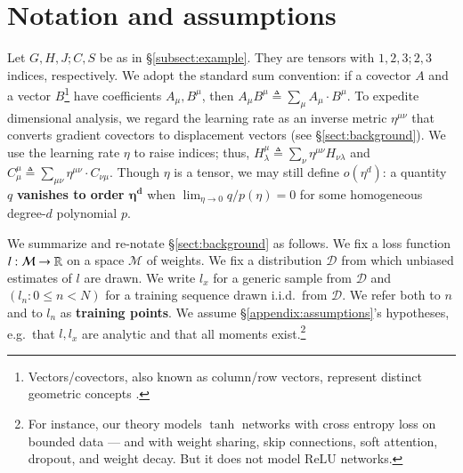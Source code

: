\documentclass[openany, notitlepage, justified]{tufte-book}
\theoremstyle{plain}
\theoremstyle{definition}
\newcommand{\Dd}{\mathcal{D}}
\newcommand{\Mm}{\mathcal{M}}
\begin{document}
\section{Notation and assumptions} \label{sect:notation}
       

        Let $G, H, J; C, S$ be as in \S \ref{subsect:example}.  They are
        tensors with $1, 2, 3; 2, 3$ indices, respectively.
        We adopt the standard sum convention: if a covector $A$ and a vector
        $B$\footnote{
            Vectors/covectors, also known as column/row vectors,
            represent distinct geometric concepts \citep{ko93}. 
        } have coefficients $A_\mu, B^\mu$, then 
        $
            A_\mu B^\mu
            \triangleq
            \sum_\mu A_\mu \cdot B^\mu
        $.
        To expedite dimensional analysis,
        we regard the learning rate as an
        inverse metric $\eta^{\mu\nu}$ that converts gradient covectors to
        displacement vectors (see \S\ref{sect:background}).  We use the
        learning rate $\eta$ to raise indices; thus,
        $
            H^{\mu}_{\lambda}
            \triangleq
            \sum_{\nu} 
            \eta^{\mu\nu} H_{\nu\lambda}
        $ and
        $
            C^{\mu}_{\mu}
            \triangleq
            \sum_{\mu \nu} \eta^{\mu\nu} \cdot C_{\nu\mu}
        $.
        Though $\eta$ is a tensor, we may still define $o(\eta^d)$: a quantity
        $q$ \textbf{vanishes to order $\mathbf{\eta^d}$} when $\lim_{\eta\to 0}
        q/p(\eta) = 0$ for some homogeneous degree-$d$ polynomial $p$.



        We summarize and re-notate \S\ref{sect:background} as follows.
        We fix a loss function $l:\Mm\to\RR$ on a space $\Mm$ of weights.  We
        fix a distribution $\Dd$ from which unbiased estimates of $l$ are
        drawn.  We write $l_x$ for a generic sample from $\Dd$ and $(l_n: 0\leq
        n<N)$ for a training sequence drawn i.i.d.\ from $\Dd$.  We refer both
        to $n$ and to $l_n$ as \textbf{training points}.  We assume
        \S\ref{appendix:assumptions}'s hypotheses, e.g.\ that $l, l_x$ are
        analytic and that all moments exist.\footnote{
            For instance, our theory models $\tanh$ networks with cross entropy
            loss on bounded data --- and with weight sharing, skip connections,
            soft attention, dropout, and weight decay.  But it does not model
            $\text{ReLU}$ networks.
        }
        
\end{document}
